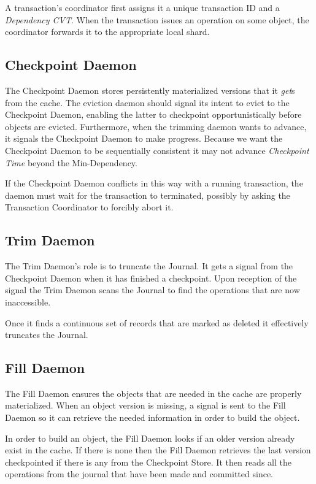 \documentclass[twoside]{article}
\begin{document}
A transaction's coordinator first assigns it a unique transaction ID and
a \emph{Dependency CVT}.
When the transaction issues an operation on some object, the coordinator
forwards it to the appropriate local shard.

\subsection{Checkpoint Daemon}
\label{sec:checkpoint-daemon}

The Checkpoint Daemon stores persistently materialized versions that it
\emph{get}s from the cache.
The eviction daemon should signal its intent to evict to the
Checkpoint Daemon, enabling the latter to checkpoint 
opportunistically before objects are evicted.
Furthermore, when the trimming daemon wants to advance, it signals the
Checkpoint Daemon to make progress.
Because we want the Checkpoint Daemon to be sequentially consistent
it may not advance \emph{Checkpoint Time} beyond the Min-Dependency.

If the Checkpoint Daemon conflicts in this way with a running
transaction, the daemon must wait for the transaction to terminated,
possibly by asking the Transaction Coordinator to forcibly abort it.


\subsection{Trim Daemon}
\label{sec:trim-daemon}

The Trim Daemon's role is to truncate the Journal. 
It gets a signal from the Checkpoint Daemon when it has finished a checkpoint.
Upon reception of the signal the Trim Daemon scans the Journal to find 
the operations that are now inaccessible.

Once it finds a continuous set of records that are marked as deleted it 
effectively truncates the Journal.

\subsection{Fill Daemon}
\label{sec:fill-daemon}

The Fill Daemon ensures the objects that are needed in the cache are properly
materialized. 
When an object version is missing, a signal is sent to the Fill Daemon so it 
can retrieve the needed information in order to build the object.

In order to build an object, the Fill Daemon looks if an older version
already exist in the cache. 
If there is none then the Fill Daemon retrieves the last version checkpointed
if there is any from the Checkpoint Store.
It then reads all the operations from the journal that have been made and committed
since.
\end{document}
